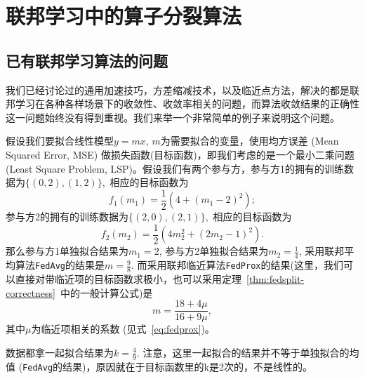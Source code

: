 \section{联邦学习中的算子分裂算法}
\label{sec:chap2-operator-split}


\subsection{已有联邦学习算法的问题}
\label{subsec:chap2-os-intro}

我们已经讨论过的通用加速技巧\cite{reddi2020fed_opt}，方差缩减技术\cite{karimireddy2020scaffold}，以及临近点方法\cite{sahu2018fedprox}，解决的都是联邦学习在各种各样场景下的收敛性、收敛率相关的问题，而算法收敛结果的正确性这一问题始终没有得到重视。我们来举一个非常简单的例子来说明这个问题。

\begin{example}
\label{eg:correctness}
假设我们要拟合线性模型$y = mx$, $m$为需要拟合的变量，使用均方误差 (Mean Squared Error, MSE) 做损失函数(目标函数)，即我们考虑的是一个最小二乘问题 (Least Square Problem, LSP)。假设我们有两个参与方，参与方1的拥有的训练数据为$\{ (0, 2), (1, 2) \},$ 相应的目标函数为
\begin{equation*}
f_1(m_1) = \frac{1}{2} (4 + (m_1 - 2)^2);
\end{equation*}
参与方2的拥有的训练数据为$\{ (2, 0), (2, 1) \},$ 相应的目标函数为
\begin{equation*}
f_2(m_2) = \frac{1}{2} (4m_2^2 + (2m_2 - 1)^2).
\end{equation*}
那么参与方1单独拟合结果为$m_1 = 2$, 参与方2单独拟合结果为$m_2 = \frac{1}{4}$, 采用联邦平均算法\texttt{FedAvg}的结果是$m = \frac{9}{8}.$ 而采用联邦临近算法\texttt{FedProx}的结果(这里，我们可以直接对带临近项的目标函数求极小，也可以采用定理~\ref{thm:fedsplit-correctness}~中的一般计算公式)是
\begin{equation}
\label{eq:eg-correctness-fedprox}
m = \frac{18 + 4\mu}{16 + 9\mu},
\end{equation}
其中$\mu$为临近项相关的系数 (见式~\eqref{eq:fedprox})。

数据都拿一起拟合结果为$k = \frac{4}{9}.$ 注意，这里一起拟合的结果并不等于单独拟合的均值 (\texttt{FedAvg}的结果)，原因就在于目标函数里的k是2次的，不是线性的。
\end{example}


